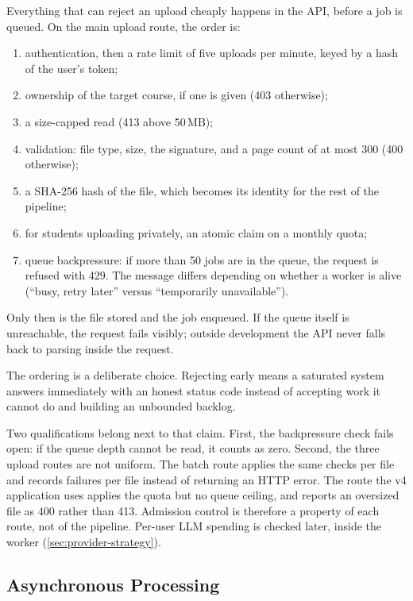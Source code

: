 Everything that can reject an upload cheaply happens in the API, before a job is
queued. On the main upload route, the order is:
\begin{enumerate}
  \item authentication, then a rate limit of five uploads per minute, keyed by a
    hash of the user's token;
  \item ownership of the target course, if one is given (403 otherwise);
  \item a size-capped read (413 above 50\,MB);
  \item validation: file type, size, the  signature, and a page
    count of at most 300 (400 otherwise);
  \item a SHA-256 hash of the file, which becomes its identity for the rest of
    the pipeline;
  \item for students uploading privately, an atomic claim on a monthly quota;
  \item queue backpressure: if more than 50 jobs are in the queue, the request is
    refused with 429. The message differs depending on whether a worker is
    alive (``busy, retry later'' versus ``temporarily unavailable'').
\end{enumerate}
Only then is the file stored and the job enqueued. If the queue itself is
unreachable, the request fails visibly; outside development the API never falls
back to parsing inside the request.

The ordering is a deliberate choice. Rejecting early means a saturated system
answers immediately with an honest status code instead of accepting work it
cannot do and building an unbounded backlog.

Two qualifications belong next to that claim. First, the backpressure check
fails open: if the queue depth cannot be read, it counts as zero. Second, the
three upload routes are not uniform. The batch route applies the same checks
per file and records failures per file instead of returning an HTTP error. The
route the v4 application uses applies the quota but no queue ceiling, and
reports an oversized file as 400 rather than 413. Admission control is therefore
a property of each route, not of the pipeline. Per-user LLM spending is checked
later, inside the worker (\cref{sec:provider-strategy}).

\subsection{Asynchronous Processing}
\label{sec:async}

